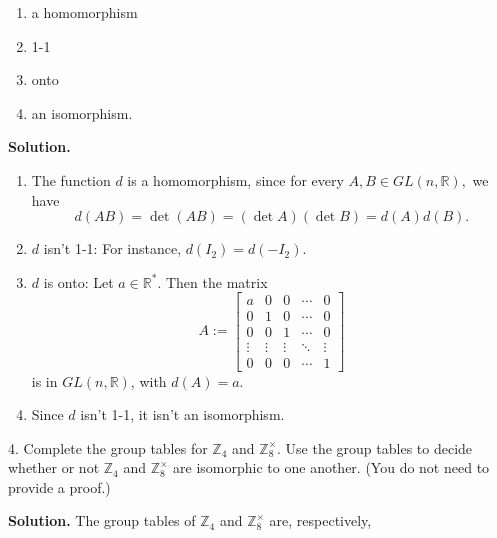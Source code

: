 \documentclass[10pt,]{book}
\theoremstyle{plain}
\theoremstyle{definition}
\theoremstyle{definition}
\theoremstyle{definition}
\theoremstyle{definition}
\numberwithin{equation}{section}
\def\Z{\mathbb{Z}}
\def\R{\mathbb{R}}
\newcommand{\amp}{&}
\begin{document}
\begin{exerciselist}
\begin{enumerate}[label=(\alph*)]
\item\hypertarget{li-177}{}a homomorphism%
\item\hypertarget{li-178}{}1-1%
\item\hypertarget{li-179}{}onto%
\item\hypertarget{li-180}{}an isomorphism.%
\end{enumerate}
%
\par\smallskip
\par\smallskip
\noindent\textbf{Solution.}\hypertarget{solution-23}{}\quad
\leavevmode%
\begin{enumerate}[label=(\alph*)]
\item\hypertarget{li-181}{}The function \(d\) is a homomorphism, since for every \(A,B \in
GL(n,\R),\) we have%
\begin{equation*}
d(AB)=\det(AB)=(\det A)(\det B)=d(A)d(B).
\end{equation*}
%
\item\hypertarget{li-182}{}\(d\) isn't 1-1: For instance, \(d(I_2)=d(-I_2)\).%
\item\hypertarget{li-183}{}\(d\) is onto: Let \(a\in \R^*\). Then the matrix%
\begin{equation*}
A:=\begin{bmatrix}a \amp  0 \amp  0 \amp  \cdots \amp  0 \\
0 \amp  1 \amp  0 \amp  \cdots \amp  0 \\
0 \amp  0 \amp  1 \amp  \cdots \amp  0 \\
\vdots \amp  \vdots \amp  \vdots \amp  \ddots \amp  \vdots \\
0 \amp  0 \amp  0 \amp  \cdots \amp  1
\end{bmatrix}
\end{equation*}
is in \(GL(n,\R)\), with \(d(A)=a\).%
\item\hypertarget{li-184}{}Since \(d\) isn't 1-1, it isn't  an isomorphism.%
\end{enumerate}
\item[4.]\hypertarget{exercise-24}{}Complete the group tables for \(\Z_4\) and \(\Z_8^{\times}\). Use the group tables to decide whether or not \(\Z_4\) and \(\Z_8^{\times}\) are isomorphic to one another. (You do not need to provide a proof.)%
\par\smallskip
\par\smallskip
\noindent\textbf{Solution.}\hypertarget{solution-24}{}\quad
The group tables of \(\Z_4\) and \(\Z_8^{\times}\) are, respectively,%
\begin{table}
\centering
\begin{tabular}{ccccc}

\end{tabular}
\end{table}
\end{exerciselist}
\end{document}
